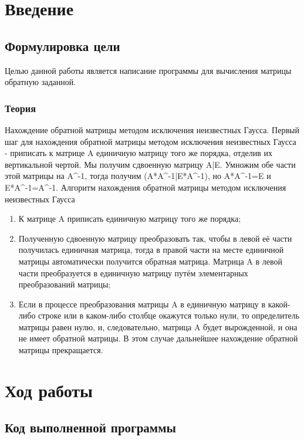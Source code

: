 \documentclass[12pt,a4paper]{scrartcl}
\begin{document}
\section{Введение}
\label{sec:intro}


\subsection{Формулировка цели}
Целью данной работы является написание программы для вычисления матрицы обратную заданной.

\subsubsection{Теория}
Нахождение обратной матрицы методом исключения неизвестных Гаусса. Первый шаг для нахождения обратной матрицы методом исключения неизвестных Гаусса - приписать к матрице A единичную матрицу того же порядка, отделив их вертикальной чертой. Мы получим сдвоенную матрицу A|E.  Умножим обе части этой матрицы на A\textasciicircum-1, тогда получим (A*A\textasciicircum-1|E*A\textasciicircum-1), но A*A\textasciicircum-1=E и E*A\textasciicircum-1=A\textasciicircum-1.
Алгоритм нахождения обратной матрицы методом исключения неизвестных Гаусса
    \begin{enumerate}
        \item К матрице A приписать единичную матрицу того же порядка;
        \item Полученную сдвоенную матрицу преобразовать так, чтобы в левой её части получилась единичная матрица, тогда в правой части на месте единичной матрицы автоматически получится обратная матрица. Матрица A в левой части преобразуется в единичную матрицу путём элементарных преобразований матрицы;
        \item Если в процессе преобразования матрицы A в единичную матрицу в какой-либо строке или в каком-либо столбце окажутся только нули, то определитель матрицы равен нулю, и, следовательно, матрица A будет вырожденной, и она не имеет обратной матрицы. В этом случае дальнейшее нахождение обратной матрицы прекращается.
    \end{enumerate}
    \noindent 

\section{Ход работы}
\subsection{Код выполненной программы}
\end{document}
